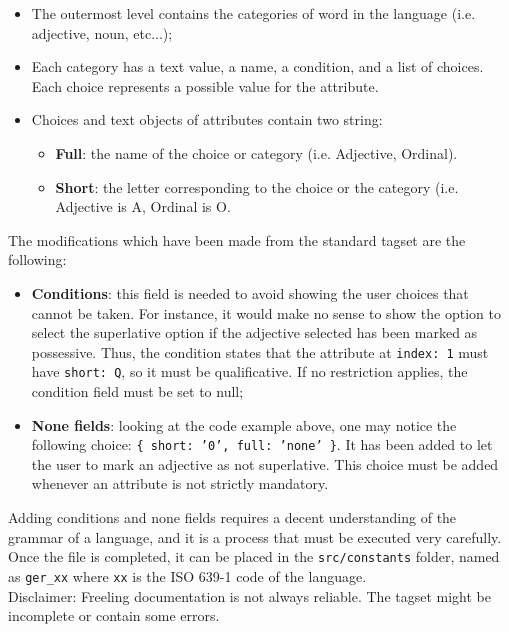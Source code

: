 \begin{itemize}
\item The outermost level contains the categories of word in the language (i.e. adjective, noun, etc...);
\item Each category has a text value, a name, a condition, and a list of choices. Each choice represents a possible value for the attribute.
\item Choices and text objects of attributes contain two string:
	\begin{itemize}
	\item \textbf{Full}: the name of the choice or category (i.e. Adjective, Ordinal).
	\item \textbf{Short}: the letter corresponding to the choice or the category (i.e. Adjective is A, Ordinal is O.
	\end{itemize}
\end{itemize}
The modifications which have been made from the standard tagset are the following:
\begin{itemize}
\item \textbf{Conditions}: this field is needed to avoid showing the user choices that cannot be taken. For instance, it would make no sense to show the option to select the superlative option if the adjective selected has been marked as possessive. Thus, the condition states that the attribute at \texttt{index: 1} must have \texttt{short: Q}, so it must be qualificative. If no restriction applies, the condition field must be set to null;
\item \textbf{None fields}: looking at the code example above, one may notice the following choice: \texttt{\{ short: '0', full: 'none' \}}. It has been added to let the user to mark an adjective as not superlative. This choice must be added whenever an attribute is not strictly mandatory.
\end{itemize}
Adding conditions and none fields requires a decent understanding of the grammar of a language, and it is a process that must be executed very carefully.\\
Once the file is completed, it can be placed in the \texttt{src/constants} folder, named as \texttt{ger\_xx} where \texttt{xx} is the ISO 639-1 code of the language.\\
Disclaimer: Freeling documentation is not always reliable. The tagset might be incomplete or contain some errors.






